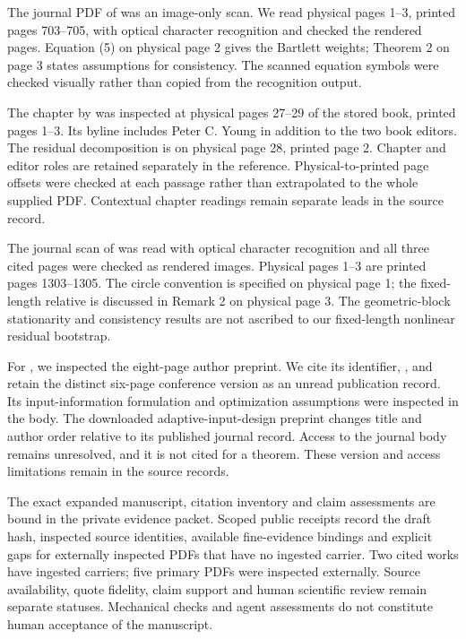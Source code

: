 \documentclass[11pt]{article}
\begin{document}
The journal PDF of \citet{newey-1987-simple} was an image-only scan. We read physical pages
1--3, printed pages 703--705, with optical character recognition and checked
the rendered pages. Equation (5) on physical page 2 gives the Bartlett weights;
Theorem 2 on page 3 states assumptions for consistency. The scanned equation
symbols were checked visually rather than copied from the recognition output.

The chapter by \citet{garnier-2008-direct} was inspected at physical pages 27--29 of the
stored book, printed pages 1--3. Its byline includes Peter C. Young in addition
to the two book editors. The residual decomposition is on physical page 28,
printed page 2. Chapter and editor roles are retained separately in the reference.
Physical-to-printed page offsets were checked at each passage rather than
extrapolated to the whole supplied PDF. Contextual chapter readings remain
separate leads in the source record.

The journal scan of \citet{politis-1994-stationary} was read with optical character recognition and
all three cited pages were checked as rendered images. Physical pages 1--3 are
printed pages 1303--1305. The circle convention is specified on physical page 1;
the fixed-length relative is discussed in Remark 2 on physical page 3. The
geometric-block stationarity and consistency results are not ascribed to our
fixed-length nonlinear residual bootstrap.

For \citet{manchester-2010-input}, we inspected the eight-page author preprint. We cite its
identifier, , and retain the distinct six-page conference
version as an unread publication record.
Its input-information formulation and optimization assumptions were inspected
in the body. The downloaded adaptive-input-design preprint changes title and
author order relative to its published journal record. Access to the journal
body remains unresolved, and it is not cited for a theorem. These version and
access limitations remain in the source records.

The exact expanded manuscript, citation inventory and claim assessments are
bound in the private evidence packet. Scoped public receipts record the draft
hash, inspected source identities, available fine-evidence bindings and explicit
gaps for externally inspected PDFs that have no ingested carrier. Two cited
works have ingested carriers; five primary PDFs were inspected externally.
Source availability, quote fidelity, claim support and human scientific review
remain separate statuses. Mechanical checks and agent assessments do not
constitute human acceptance of the manuscript.

\end{document}
